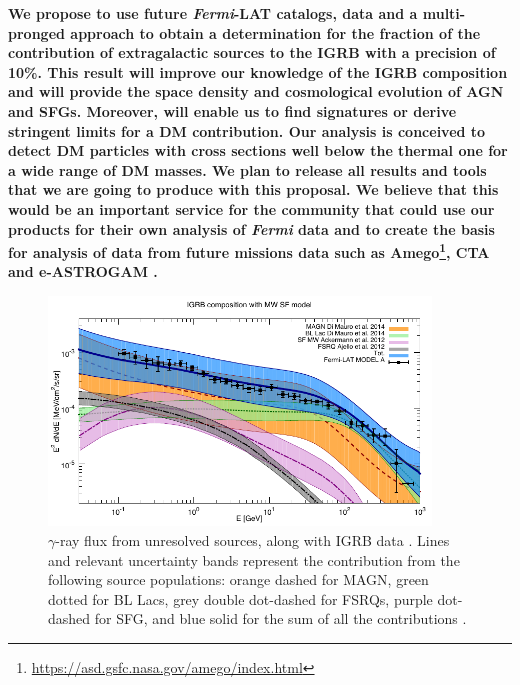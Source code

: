 \documentclass[12 pt]{article}
\begin{document}
{\bf 
We propose to use future {\it Fermi}-LAT catalogs, data and a multi-pronged approach to obtain a determination for the fraction of the contribution of extragalactic sources to the IGRB with a precision of 10\%.  
This result will improve our knowledge of the IGRB composition and will provide the space density and cosmological evolution of AGN and SFGs. 
Moreover, will enable us to find signatures or derive stringent limits for a DM contribution. 
Our analysis is conceived to detect DM particles with cross sections well below the thermal one for a wide range of DM masses.
We plan to release all results and tools that we are going to produce with this proposal. 
We believe that this would be an important service for the community that could use our products for their own analysis of {\it Fermi} data and to create the basis for analysis of data from future missions data such as Amego\footnote{\url{https://asd.gsfc.nasa.gov/amego/index.html}}, CTA \cite{Ong:2017ihp} and e-ASTROGAM \cite{Tatischeff:2016ykb}.}


\begin{figure} %
   \centering
  \includegraphics[width=4.0in]{fluxcompart_2014_unr.pdf} 
\vspace*{-4mm}
   \caption{$\gamma$-ray flux from unresolved sources, along with IGRB data \cite{Ackermann:2014usa}. Lines and relevant uncertainty bands represent the contribution from the following source populations: orange dashed for MAGN,  green dotted for BL Lacs, grey double dot-dashed for FSRQs, purple dot-dashed for SFG, and blue solid for the sum of all the contributions \cite{DiMauro:2015tfa}.}
   \label{fig:igrbcomp}
\end{figure}
\end{document}

